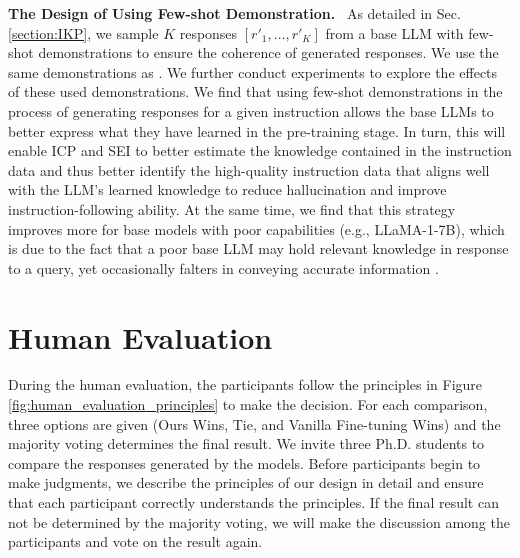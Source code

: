 \noindent
\textbf{The Design of Using Few-shot Demonstration.}
\
As detailed in Sec. \ref{section:IKP}, we sample $K$ responses $[r'_1,...,r'_K]$ from a base LLM with few-shot demonstrations \citep{lin2024the} to ensure the coherence of generated responses.
We use the same demonstrations as \citet{lin2024the}.
We further conduct experiments to explore the effects of these used demonstrations.
We find that using few-shot demonstrations in the process of generating responses for a given instruction allows the base LLMs to better express what they have learned in the pre-training stage.
In turn, this will enable ICP and SEI to better estimate the knowledge contained in the instruction data and thus better identify the high-quality instruction data that aligns well with the LLM’s learned knowledge to reduce hallucination and improve instruction-following ability.
At the same time, we find that this strategy improves more for base models with poor capabilities (e.g., LLaMA-1-7B), which is due to the fact that a poor base LLM may hold relevant knowledge in response to a query, yet occasionally falters in conveying accurate information \citep{zhang-etal-2024-self}.

\section{Human Evaluation}
\label{appendix:huamn}
During the human evaluation, the participants follow the principles in Figure \ref{fig:human_evaluation_principles} to make the decision.
For each comparison, three options are given (Ours Wins, Tie, and Vanilla Fine-tuning Wins) and the majority voting determines the final result. 
We invite three Ph.D. students to compare the responses generated by the models.
Before participants begin to make judgments, we describe the principles of our design in detail and ensure that each participant correctly understands the principles.
If the final result can not be determined by the majority voting, we will make the discussion among the participants and vote on the result again.


